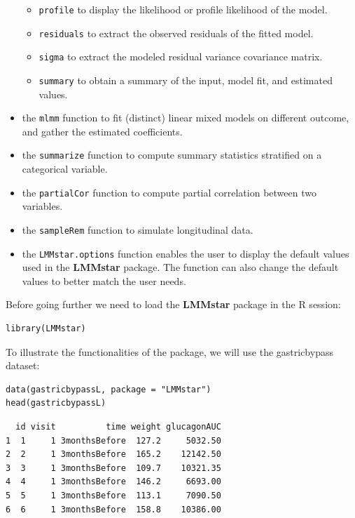 \documentclass[12pt]{article}
\begin{document}
\begin{itemize}
\begin{itemize}
\item \texttt{profile} to display the likelihood or profile likelihood of the model.
\item \texttt{residuals} to extract the observed residuals of the fitted model.
\item \texttt{sigma} to extract the modeled residual variance covariance matrix.
\item \texttt{summary} to obtain a summary of the input, model fit, and estimated values.
\end{itemize}
\item the \texttt{mlmm} function to fit (distinct) linear mixed models on
different outcome, and gather the estimated coefficients.
\item the \texttt{summarize} function to compute summary statistics stratified on a categorical variable.
\item the \texttt{partialCor} function to compute partial correlation between two variables.
\item the \texttt{sampleRem} function to simulate longitudinal data.
\item the \texttt{LMMstar.options} function enables the user to display the
default values used in the \textbf{LMMstar} package. The function
can also change the default values to better match the user needs.
\end{itemize}

\bigskip

Before going further we need to load the \textbf{LMMstar} package in the R
session:
\lstset{language=r,label= ,caption= ,captionpos=b,numbers=none}
\begin{lstlisting}
library(LMMstar)
\end{lstlisting}

To illustrate the functionalities of the package, we will use the
gastricbypass dataset:
\lstset{language=r,label= ,caption= ,captionpos=b,numbers=none}
\begin{lstlisting}
data(gastricbypassL, package = "LMMstar")
head(gastricbypassL)
\end{lstlisting}

\begin{verbatim}
  id visit          time weight glucagonAUC
1  1     1 3monthsBefore  127.2     5032.50
2  2     1 3monthsBefore  165.2    12142.50
3  3     1 3monthsBefore  109.7    10321.35
4  4     1 3monthsBefore  146.2     6693.00
5  5     1 3monthsBefore  113.1     7090.50
6  6     1 3monthsBefore  158.8    10386.00
\end{verbatim}
\end{document}
